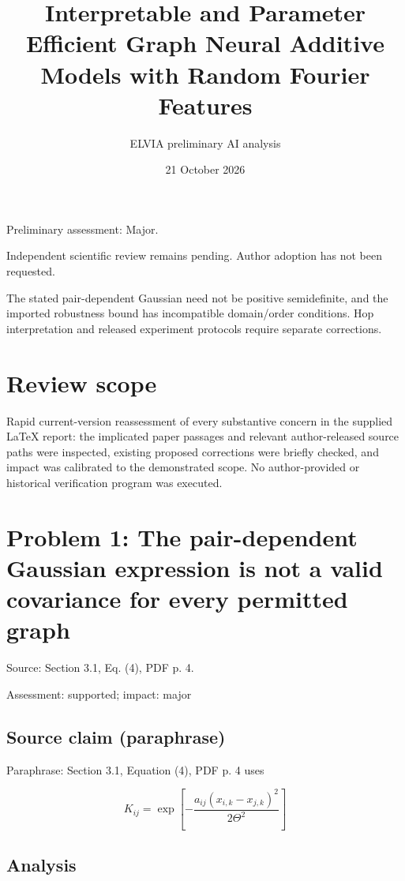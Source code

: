 \documentclass[11pt]{article}
\begin{document}
\title{Interpretable and Parameter Efficient Graph Neural Additive Models with Random Fourier Features}

\author{ELVIA preliminary AI analysis}\date{21 October 2026}\maketitle

Preliminary assessment: Major.\par

Independent scientific review remains pending. Author adoption has not been requested.

The stated pair-dependent Gaussian need not be positive semidefinite, and the imported robustness bound has incompatible domain/order conditions. Hop interpretation and released experiment protocols require separate corrections.

\section*{Review scope}

Rapid current-version reassessment of every substantive concern in the supplied LaTeX report: the implicated paper passages and relevant author-released source paths were inspected, existing proposed corrections were briefly checked, and impact was calibrated to the demonstrated scope. No author-provided or historical verification program was executed.

\section*{Problem 1: The pair-dependent Gaussian expression is not a valid covariance for every permitted graph}

Source: Section 3.1, Eq. (4), PDF p. 4.

Assessment: supported; impact: major

\subsection*{Source claim (paraphrase)}

Paraphrase: Section 3.1, Equation (4), PDF p. 4 uses

\[K_{ij}=\exp\!\left[-\frac{a_{ij}(x_{i,k}-x_{j,k})^2}{2\Theta^2}\right]\]

\subsection*{Analysis}
\end{document}
